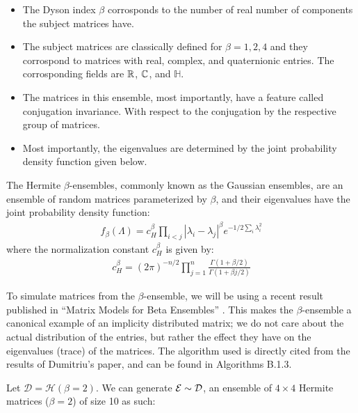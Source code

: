 \begin{itemize}
  \item The Dyson index $\beta$ corrosponds to the number of real number of components the subject matrices have.
  \item The subject matrices are classically defined for $\beta = 1,2,4$ and they corrospond to matrices with real, complex, and quaternionic entries. The corrosponding fields are $\mathbb{R}$, $\mathbb{C}$, and $\mathbb{H}$.
  \item The matrices in this ensemble, most importantly, have a feature called conjugation invariance. With respect to the conjugation by the respective group of matrices.
  \item Most importantly, the eigenvalues are determined by the joint probability density function given below.
\end{itemize}

\begin{definition}
The Hermite $\beta$-ensembles, commonly known as the Gaussian ensembles, are an ensemble of random matrices parameterized by $\beta$, and their eigenvalues have the joint probability density function:
\begin{align*}
f_\beta(\Lambda) = c_H^\beta \prod_{i < j} |\lambda_i - \lambda_j|^\beta e^{-1/2\sum_i \lambda_i^2}
\end{align*}
where the normalization constant $c_H^\beta$ is given by:
\begin{align*}
c_H^\beta = (2\pi)^{-n/2} \prod_{j = 1}^n \frac{\Gamma(1 + \beta/2)}{\Gamma(1 + \beta j/2)}
\end{align*}
\end{definition}

To simulate matrices from the $\beta$-ensemble, we will be using a recent result published in ``Matrix Models for Beta Ensembles'' \cite{dimitriu:2018}. This makes the $\beta$-ensemble a canonical example of an implicity distributed matrix; we do not care about the actual distribution of the entries, but rather the effect they have on the eigenvalues (trace) of the matrices. The algorithm used is directly cited from the results of Dumitriu's paper, and can be found in Algorithms B.1.3.

\begin{code}[Hermite Beta = 2 Ensemble]
Let $\mathcal{D} = \mathcal{H}(\beta = 2)$. We can generate $\mathcal{E} \sim \mathcal{D}$, an ensemble of $4 \times 4$ Hermite matrices ($\beta = 2$) of size 10 as such:
\end{code}

